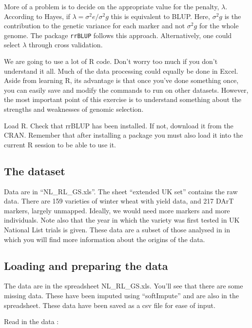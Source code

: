 \documentclass[
]{book}
\begin{document}
More of a problem is to decide on the appropriate value for the penalty, \(λ\). According to
Hayes, if \(λ = σ^2e / σ^2g\) this is equivalent to BLUP. Here, \(σ^2g\) is the contribution to the genetic variance for each marker and not \(σ^2g\) for the whole genome. The package \texttt{rrBLUP} \citep{Endelman2011} follows this approach. Alternatively, one could select \(λ\) through cross validation.

We are going to use a lot of R code. Don't worry too much if you don't understand it all. Much of the data processing could equally be done in Excel. Aside from learning R, its advantage is that once you've done something once, you can easily save and modify the commands to run on other datasets. However, the most important point of this exercise is to understand something about the strengths and weaknesses of genomic selection.

Load R. Check that rrBLUP has been installed. If not, download it from the CRAN. Remember that after installing a package you must also load it into the current R session to be able to use it.

\hypertarget{the-dataset}{%
\subsection{The dataset}\label{the-dataset}}

Data are in ``NL\_RL\_GS.xls''. The sheet ``extended UK set'' contains the raw data. There are 159
varieties of winter wheat with yield data, and 217 DArT markers, largely unmapped. Ideally,
we would need more markers and more individuals. Note also that the year in which the
variety was first tested in UK National List trials is given. These data are a subset of those analysed in \citet{Mackay2011} in which you will find more information about the origins of the data.

\hypertarget{loading-and-preparing-the-data}{%
\subsection{Loading and preparing the data}\label{loading-and-preparing-the-data}}

The data are in the spreadsheet NL\_RL\_GS.xls. You'll see that there are some missing data.
These have been imputed using ``softImpute'' and are also in the spreadsheet. These data have been saved as a csv file for ease of input.

Read in the data :
\end{document}
